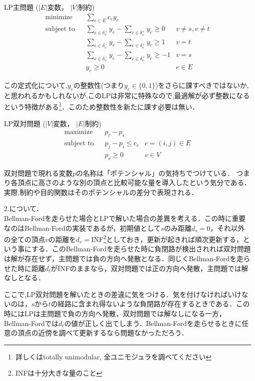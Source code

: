 \documentclass[13pt]{jarticle}
\theoremstyle{nonitalic} %
\begin{document}
LP主問題
($|E|$変数， $|V|$制約)
\begin{align}
 &&&&&\textrm{minimize}   && \sum_{e  \in E} c_e y_e \\
 &&&&&\textrm{subject to} && \sum_{e \in \delta_v^- } y_e - \sum_{e \in \delta_v^+} y_e \geq 0 & v\neq s, v\neq t  &&&&&\\
 &&&&&                    && \sum_{e \in \delta_v^- } y_e - \sum_{e \in \delta_v^+} y_e \geq 1 & v = t  &&&&&\\
 &&&&&                    && \sum_{e \in \delta_v^- } y_e - \sum_{e \in \delta_v^+} y_e \geq -1 & v = s  &&&&&\\
 &&&&&                    &&  y_e \geq 0 & e \in E&&&&&
\end{align}

この定式化について,$y_e$の整数性(つまり$y_e \in \{ 0,1 \} $)をさらに課すべきではないか,と思われるかもしれないが,このLPは非常に特殊なので,最適解が必ず整数になるという特徴がある\footnote{詳しくはtotally unimodular, 全ユニモジュラを調べてください}．このため整数性を新たに課す必要は無い．


LP双対問題
($|V|$変数， $|E|$制約)
\begin{align}
 &&&&&\textrm{maximize}   && p_t - p_s \\
 &&&&&\textrm{subject to} && p_j - p_i\leq c_e & e = (i,j) \in E  &&&&&\\
 &&&&&                    && p_v \geq 0 & v \in V &&&&&
\end{align}

双対問題で現れる変数$p$の名称は「ポテンシャル」の気持ちでつけている．
つまり各頂点に高さのような別の頂点と比較可能な量を導入したという気分である．実際,制約や目的関数はそのポテンシャルの差分で表現される．


2.について．\\
 Bellman-Fordを走らせた場合とLPで解いた場合の差異を考える．この時に重要なのはBellman-Fordの実装であるが，初期値として$s$のみ距離$d_s=0$，それ以外の全ての頂点$v$の距離を$d_v=$INF\footnote{INFは十分大きな量のこと}としておき，更新が起きれば順次更新する，という事にする．このBellman-Fordを走らせた時に負閉路が検出されれば双対問題は解が存在せず，主問題では負の方向へ発散となる．同じくBellman-Fordを走らせた時に距離$d_t$がINFのままなら，双対問題では正の方向へ発散，主問題では解なしとなる．

ここで,LP双対問題を解いたときの差違に気をつける．気を付けなければいけないのは，$s$から$t$の経路に含まれ得ないような負閉路が存在するときである．この時にはLPは主問題で負の方向へ発散，双対問題では解なしになる一方，Bellman-Fordでは$d_t$の値が正しく出てしまう．Bellman-Fordを走らせるときに任意の頂点の近傍を調べて更新するなら問題なかっただろう．
\end{document}

